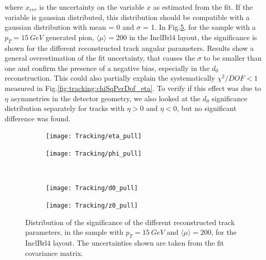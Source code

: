 \documentclass[a4paper,twoside,12pt]{book}
\begin{document}
where $x_{err}$ is the uncertainty on the variable $x$ as estimated from the fit. If the variable is gaussian distributed, this distribution should be compatible with
a gaussian distribution with mean = 0 and $\sigma$ = 1. In Fig.\ref{fig:tracking:pull}, for the sample with a $p_{T} = 15\ GeV$ generated pion, $\langle\mu\rangle = 200$ in the InclBrl4 layout, the significance is shown for the different
reconstructed track angular parameters. Results show a general overestimation of the fit uncertainty, that causes the $\sigma$ to be smaller than one and confirm the presence of 
a negative bias, especially in the $d_{0}$ reconstruction. This could also partially explain the systematically $\chi^2/DOF < 1$ measured in
Fig.\ref{fig:tracking:chiSqPerDof_eta}. To verify if this effect was due to $\eta$ asymmetries in the detector geometry, 
we also looked at the $d_{0}$ significance distribution separately for tracks with $\eta > 0$ and $\eta < 0$, but no significant difference was found. \\

\begin{figure}
\begin{subfigure}{.5\linewidth}
\texttt{[image: Tracking/eta\_pull]}
\caption{}
\label{fig:tracking:eta_pull}
\end{subfigure}
\begin{subfigure}{.5\linewidth}
\texttt{[image: Tracking/phi\_pull]}
\caption{}
\label{fig:tracking:phi_pull}
\end{subfigure}\\[1ex]
\begin{subfigure}{.5\linewidth}
\texttt{[image: Tracking/d0\_pull]}
\caption{}
\label{fig:tracking:d0_pull}
\end{subfigure}
\begin{subfigure}{.5\linewidth}
\texttt{[image: Tracking/z0\_pull]}
\caption{}
\label{fig:tracking:z0_pull}
\end{subfigure}

\caption{Distribution of the significance of the different reconstructed track parameters, in the sample with $p_{T} = 15\ GeV$ and $\langle\mu\rangle = 200$, for the InclBrl4 layout. The
uncertainties shown are taken from the fit covariance matrix.}
\label{fig:tracking:pull}
\end{figure}
\end{document}
